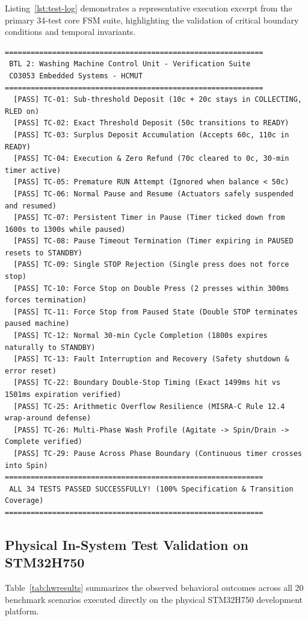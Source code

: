 \noindent Listing~\ref{lst:test-log} demonstrates a representative execution excerpt from the primary 34-test core FSM suite, highlighting the validation of critical boundary conditions and temporal invariants.

\begin{lstlisting}[style=logstyle, caption={Execution log excerpt from the automated core FSM verification suite}, label={lst:test-log}]
============================================================
 BTL 2: Washing Machine Control Unit - Verification Suite
 CO3053 Embedded Systems - HCMUT
============================================================
  [PASS] TC-01: Sub-threshold Deposit (10c + 20c stays in COLLECTING, RLED on)
  [PASS] TC-02: Exact Threshold Deposit (50c transitions to READY)
  [PASS] TC-03: Surplus Deposit Accumulation (Accepts 60c, 110c in READY)
  [PASS] TC-04: Execution & Zero Refund (70c cleared to 0c, 30-min timer active)
  [PASS] TC-05: Premature RUN Attempt (Ignored when balance < 50c)
  [PASS] TC-06: Normal Pause and Resume (Actuators safely suspended and resumed)
  [PASS] TC-07: Persistent Timer in Pause (Timer ticked down from 1600s to 1300s while paused)
  [PASS] TC-08: Pause Timeout Termination (Timer expiring in PAUSED resets to STANDBY)
  [PASS] TC-09: Single STOP Rejection (Single press does not force stop)
  [PASS] TC-10: Force Stop on Double Press (2 presses within 300ms forces termination)
  [PASS] TC-11: Force Stop from Paused State (Double STOP terminates paused machine)
  [PASS] TC-12: Normal 30-min Cycle Completion (1800s expires naturally to STANDBY)
  [PASS] TC-13: Fault Interruption and Recovery (Safety shutdown & error reset)
  [PASS] TC-22: Boundary Double-Stop Timing (Exact 1499ms hit vs 1501ms expiration verified)
  [PASS] TC-25: Arithmetic Overflow Resilience (MISRA-C Rule 12.4 wrap-around defense)
  [PASS] TC-26: Multi-Phase Wash Profile (Agitate -> Spin/Drain -> Complete verified)
  [PASS] TC-29: Pause Across Phase Boundary (Continuous timer crosses into Spin)
============================================================
 ALL 34 TESTS PASSED SUCCESSFULLY! (100% Specification & Transition Coverage)
============================================================
\end{lstlisting}

\subsection{Physical In-System Test Validation on STM32H750}

Table~\ref{tab:hwresults} summarizes the observed behavioral outcomes across all 20 benchmark scenarios executed directly on the physical STM32H750 development platform.

